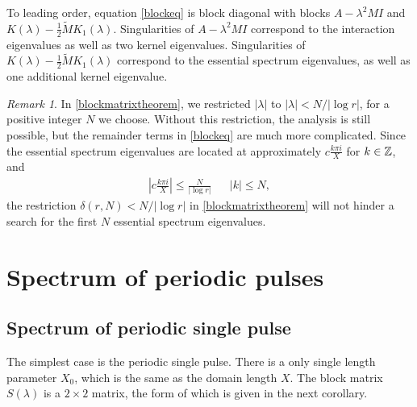\documentclass[11pt,reqno]{amsart}
\theoremstyle{plain}
\theoremstyle{definition}
\theoremstyle{remark}
\newtheorem{remark}[theorem]{Remark}
\begin{document}
To leading order, equation \cref{blockeq} is block diagonal with blocks $A - \lambda^2 MI$ and $K(\lambda) -\frac{1}{2} \tilde{M} K_1(\lambda)$. Singularities of $A - \lambda^2 MI$ correspond to the interaction eigenvalues as well as two kernel eigenvalues. Singularities of $K(\lambda) -\frac{1}{2} \tilde{M} K_1(\lambda)$ correspond to the essential spectrum eigenvalues, as well as one additional kernel eigenvalue.

\begin{remark}
In \cref{blockmatrixtheorem}, we restricted $|\lambda|$ to $|\lambda| < N/|\log r|$, for a positive integer $N$ we choose. Without this restriction, the analysis is still possible, but the remainder terms in \cref{blockeq} are much more complicated. Since the essential spectrum eigenvalues are located at approximately $c\frac{k \pi i}{X}$ for $k \in \mathbb{Z}$, and \begin{align*}
\left| c\frac{k \pi i}{X} \right| \leq \frac{N}{|\log r|} && |k|\leq N,
\end{align*} 
the restriction $\delta(r,N) < N/|\log r|$ in \cref{blockmatrixtheorem} will not hinder a search for the first $N$ essential spectrum eigenvalues.
\end{remark}

\section{Spectrum of periodic pulses}

\subsection{Spectrum of periodic single pulse}\label{sec:per1peig}

The simplest case is the periodic single pulse. There is a only single length parameter $X_0$, which is the same as the domain length $X$. The block matrix $S(\lambda)$ is a $2\times 2$ matrix, the form of which is given in the next corollary.
\end{document}
